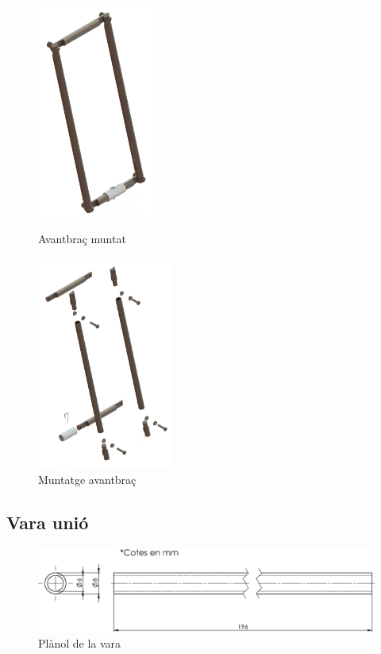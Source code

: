\documentclass[a4paper, 12pt]{article}
\begin{document}
\begin{figure}[h!]
\begin{minipage}[b]{.45\linewidth}
\centering
\includegraphics[height=7cm]{./imgComp/avant}
\caption{Avantbraç muntat}
\end{minipage}
\begin{minipage}[b]{.45\linewidth}
\centering
\includegraphics[height=7cm]{./imgComp/avant_expl}
\caption{Muntatge avantbraç}
\end{minipage}
\end{figure}

\subsection{Vara unió}

\begin{figure}[h!]
\centering
\includegraphics[width=15cm]{./sketch/vara}
\caption{Plànol de la vara}
\end{figure}
\end{document}

